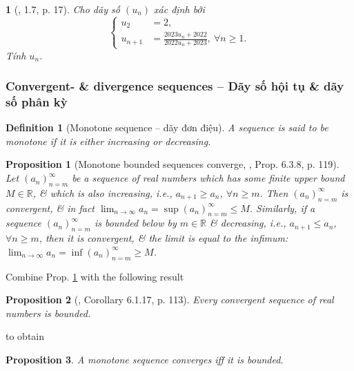 \documentclass{article}
\newtheorem{baitoan}{}
\newtheorem{definition}{Definition}
\newtheorem{proposition}{Proposition}
\begin{document}
\begin{baitoan}[\cite{Quoc_Long_Dat_Nam_VMC}, 1.7, p. 17]
	Cho dãy số $(u_n)$ xác định bởi
	\begin{equation*}
		\left\{\begin{split}
			u_2 &= 2,\\
			u_{n+1} &= \frac{2023u_n + 2022}{2022u_n + 2023},\ \forall n\ge1.
		\end{split}\right.
	\end{equation*}
	Tính $u_n$.
\end{baitoan}


\subsubsection{Convergent- \& divergence sequences -- Dãy số hội tụ \& dãy số phân kỳ}

\begin{definition}[Monotone sequence -- dãy đơn điệu]
	A sequence is said to be {\rm monotone} if it is either increasing or decreasing.
\end{definition}

\begin{proposition}[Monotone bounded sequences converge, \cite{Tao_analysis_1}, Prop. 6.3.8, p. 119]
	\label{prop: monotone bounded sequences converge}
	Let $(a_n)_{n=m}^\infty$ be a sequence of real numbers which has some finite upper bound $M\in\mathbb{R}$, \& which is also increasing, i.e., $a_{n+1}\ge a_n$, $\forall n\ge m$. Then $(a_n)_{n=m}^\infty$ is convergent, \& in fact $\lim_{n\to\infty} a_n = \sup(a_n)_{n=m}^\infty\le M$. Similarly, if a sequence $(a_n)_{n=m}^\infty$ is bounded below by $m\in\mathbb{R}$ \& decreasing, i.e., $a_{n+1}\le a_n$, $\forall n\ge m$, then it is convergent, \& the limit is equal to the infimum: $\lim_{n\to\infty} a_n = \inf(a_n)_{n=m}^\infty\ge M$.
\end{proposition}
Combine Prop. \ref{prop: monotone bounded sequences converge} with the following result
\begin{proposition}[\cite{Tao_analysis_1}, Corollary 6.1.17, p. 113]
	Every convergent sequence of real numbers is bounded.
\end{proposition}
to obtain
\begin{proposition}
	A monotone sequence converges iff it is bounded.
\end{proposition}
\end{document}
